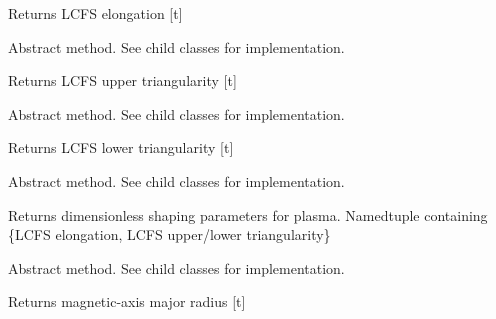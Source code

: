 \documentclass[letterpaper,10pt,english]{sphinxmanual}
\begin{document}
\begin{fulllineitems}
\begin{fulllineitems}
Returns LCFS elongation {[}t{]}

\end{fulllineitems}


\begin{fulllineitems}
\label{eqtools:eqtools.core.Equilibrium.getUpperTriangularity}
Abstract method.  See child classes for implementation.

Returns LCFS upper triangularity {[}t{]}

\end{fulllineitems}


\begin{fulllineitems}
\label{eqtools:eqtools.core.Equilibrium.getLowerTriangularity}
Abstract method.  See child classes for implementation.

Returns LCFS lower triangularity {[}t{]}

\end{fulllineitems}


\begin{fulllineitems}
\label{eqtools:eqtools.core.Equilibrium.getShaping}
Abstract method.  See child classes for implementation.

Returns dimensionless shaping parameters for plasma.
Namedtuple containing \{LCFS elongation, LCFS upper/lower triangularity\}

\end{fulllineitems}


\begin{fulllineitems}
\label{eqtools:eqtools.core.Equilibrium.getMagR}
Abstract method.  See child classes for implementation.

Returns magnetic-axis major radius {[}t{]}

\end{fulllineitems}



\end{fulllineitems}
\end{document}
